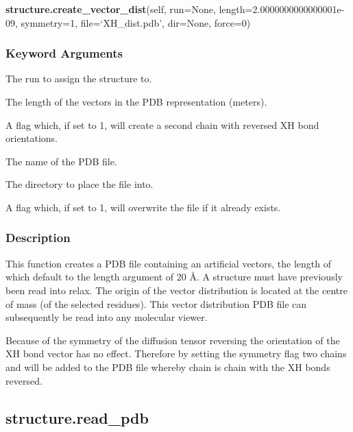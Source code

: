  \textsf{\textbf{structure.create\_vector\_dist}(self, run=None, length=2.0000000000000001e-09, symmetry=1, file=`XH\_dist.pdb', dir=None, force=0)} 

  
 \subsubsection{Keyword Arguments} 

   The run to assign the structure to.   

   The length of the vectors in the PDB representation (meters).   

   A flag which, if set to 1, will create a second chain with reversed XH bond     orientations.   

   The name of the PDB file.   

   The directory to place the file into.   

   A flag which, if set to 1, will overwrite the file if it already exists.  

  

  
 \subsubsection{Description} 

 This function creates a PDB file containing an artificial vectors, the length of which default to the length argument of 20 \AA.  A structure must have previously been read into relax.  The origin of the vector distribution is located at the centre of mass (of the selected residues).  This vector distribution PDB file can subsequently be read into any molecular viewer. 
  

 Because of the symmetry of the diffusion tensor reversing the orientation of the XH bond vector has no effect.  Therefore by setting the symmetry flag two chains  and  will be added to the PDB file whereby chain  is chain  with the XH bonds reversed. 
  

  

 \newpage 

 \subsection{structure.read\_pdb} 

